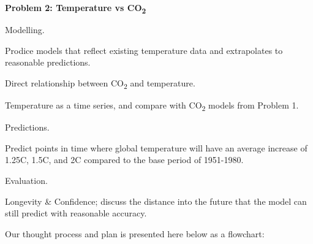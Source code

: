 \documentclass{mcmthesis}
\begin{document}
    \noindent\textbf{Problem 2: Temperature vs CO\textsubscript{2}}

    \begin{adjustwidth}{1cm}{}

        \noindent Modelling.

        \vspace{-6pt}
        \noindent Prodice models that reflect existing temperature data and extrapolates to reasonable predictions.

        \begin{adjustwidth}{1cm}{}
            \noindent Direct relationship between CO\textsubscript{2} and temperature.

            \noindent Temperature as a time series, and compare with CO\textsubscript{2} models from Problem 1.
        \end{adjustwidth}

        \noindent Predictions.

        \vspace{-6pt}
        \noindent Predict points in time where global temperature will have an average increase of 1.25\textdegree C, 1.5\textdegree C, and 2\textdegree C compared to the base period of 1951-1980.

        \noindent Evaluation.

        \vspace{-6pt}
        \noindent Longevity \& Confidence; discuss the distance into the future that the model can still predict with reasonable accuracy.


    \end{adjustwidth}

    \bigskip

    \noindent Our thought process and plan is presented here below as a flowchart:
    \begin{center}
    \end{center}
\end{document}
